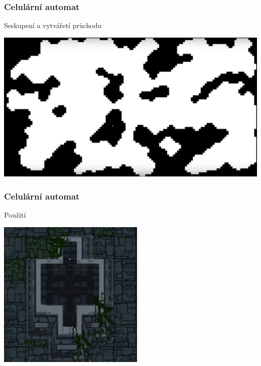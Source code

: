 \documentclass{beamer}
\begin{document}
\begin{frame}
	\frametitle{Celulární automat}
	\begin{itemize}
		\item Seskupení a vytvářetí průchodu
		\begin{center}
			\item
			\includegraphics[width=\linewidth]{celular-ex3.png}	
		\end{center}
	\end{itemize}	
\end{frame}
\begin{frame}
	\frametitle{Celulární automat}
	\begin{itemize}
		\item Použití
		\begin{center}
			\item
			\includegraphics[width=7cm]{cave-paint.png}	
		\end{center}
	\end{itemize}	
\end{frame}
\end{document}
